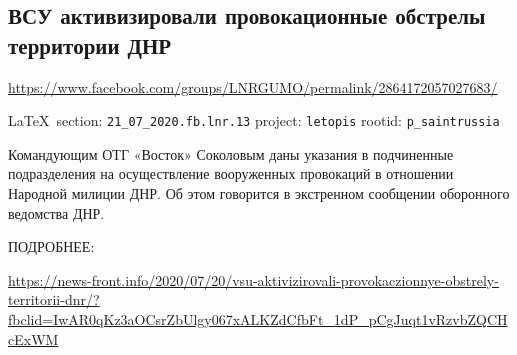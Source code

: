  
 

\subsection{ВСУ активизировали провокационные обстрелы территории ДНР}
\url{https://www.facebook.com/groups/LNRGUMO/permalink/2864172057027683/}
  
\vspace{0.5cm}
{\small\LaTeX~section: \verb|21_07_2020.fb.lnr.13| project: \verb|letopis| rootid: \verb|p_saintrussia|}
\vspace{0.5cm}

Командующим ОТГ «Восток» Соколовым даны указания в подчиненные подразделения на
осуществление вооруженных провокаций в отношении Народной милиции ДНР. Об этом
говорится в экстренном сообщении оборонного ведомства ДНР.

ПОДРОБНЕЕ: 

\url{https://news-front.info/2020/07/20/vsu-aktivizirovali-provokaczionnye-obstrely-territorii-dnr/?fbclid=IwAR0qKz3aOCsrZbUlgy067xALKZdCfbFt_1dP_pCgJuqt1vRzvbZQCHcExWM}
  

